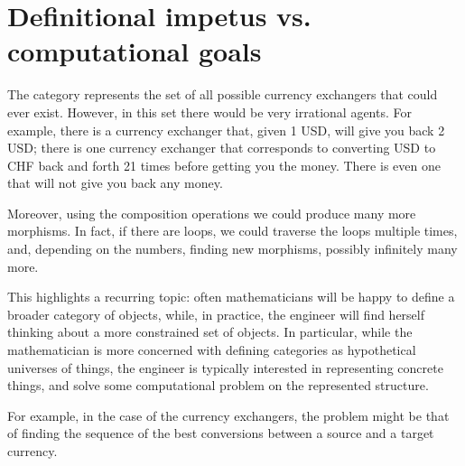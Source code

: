 


\section{Definitional impetus vs. computational goals  }

The category \Curr represents the set of all possible currency exchangers that could ever exist. However, in this set there would be very irrational agents.
For example, there is a currency exchanger that, given 1 USD, will give you back 2 USD; there is one currency exchanger that corresponds to converting USD to CHF back and forth 21 times before getting you the money. There is even one that will not give you back any money.

Moreover, using the composition operations we could produce many more morphisms. In fact, if there are loops, we could traverse the loops multiple times, and, depending on the numbers, finding new morphisms, possibly infinitely many more.

This highlights a recurring topic: often mathematicians will be happy to define a broader category of objects, while, in practice, the engineer will find herself thinking about a more constrained set of objects.
In particular, while the mathematician is more concerned with defining categories as hypothetical universes of things, the engineer is typically interested in representing concrete things, and solve some computational problem on the represented structure.

For example, in the case of the currency exchangers, the problem might be that of finding the sequence of the best conversions between a source and a target currency.

